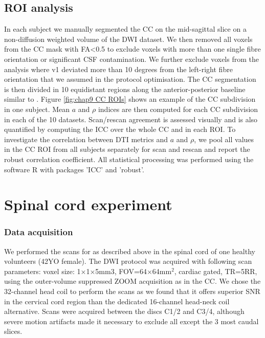 \subsection{ROI analysis} 
In each subject we manually segmented the \gls{CC} on the mid-sagittal slice on a non-diffusion weighted volume of the \gls{DWI} dataset. We then removed all voxels from the \gls{CC} mask with FA<0.5 to exclude voxels with more than one single fibre orientation or significant CSF contamination. We further exclude voxels from the analysis where v1 deviated more than 10 degrees from the left-right fibre orientation that we assumed in the protocol optimisation. The \gls{CC} segmentation is then divided in 10 equidistant regions along the anterior-posterior baseline similar to \cite{Aboitiz:1992}. Figure \ref{fig:chap9 CC ROIs} shows an example of the \gls{CC} subdivision in one subject. Mean $a$ and $\rho$ indices are then computed for each \gls{CC} subdivision in each of the 10 datasets. Scan/rescan agreement is assessed visually and is also quantified by computing the \gls{ICC} \citep{Shrout:1979} over the whole \gls{CC} and in each \gls{ROI}. To investigate the correlation between DTI metrics and $a$ and $\rho$, we pool all values in the \gls{CC} \gls{ROI} from all subjects separately for scan and rescan and report the robust correlation coefficient\citep{Huber:1996}. All statistical processing was performed using the software R\citep{RCoreTeam:2012} with packages 'ICC'\citep{Wolak:2011} and 'robust'\citep{Wang:2012}.

\section{Spinal cord experiment}
\subsubsection*{Data acquisition}
We performed the scans for \SFasym{} as described above in the spinal cord of one healthy volunteers (42YO female). The \SF{} DWI protocol was acquired with following scan parameters: voxel size: 1$\times$1$\times$5mm3, FOV=64$\times$64mm$^2$, cardiac gated, TR=5RR, using the outer-volume suppressed ZOOM acquisition \citep{Wilm:2007} as in the \gls{CC}. We chose the 32-channel head coil to perform the scans as we found that it offers superior \gls{SNR} in the cervical cord region than the dedicated 16-channel head-neck coil alternative. Scans were acquired between the discs C1/2 and C3/4, although severe motion artifacts made it necessary to exclude all except the 3 most caudal slices. 


